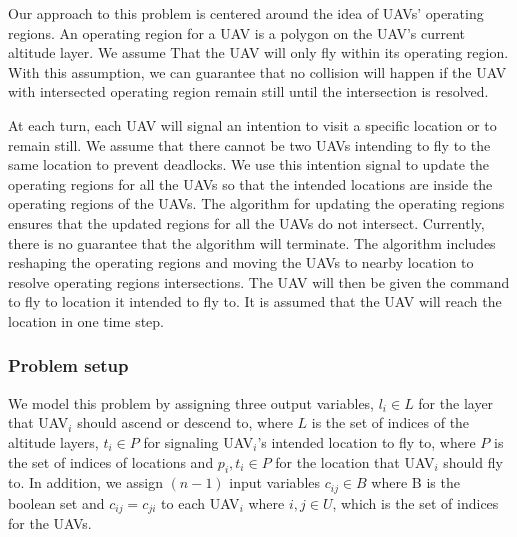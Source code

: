 \documentclass[]{article}
\begin{document}
Our approach to this problem is centered around the idea of UAVs'
operating regions. An operating region for a UAV is a polygon on the
UAV's current altitude layer. We assume That the UAV will only fly
within its operating region. With this assumption, we can guarantee that
no collision will happen if the UAV with intersected operating region
remain still until the intersection is resolved.

At each turn, each UAV will signal an intention to visit a specific location 
or to remain still. We assume that there cannot be two UAVs intending to fly 
to the same location to prevent deadlocks. We use this intention signal to update 
the operating regions for all the UAVs so that the intended locations are inside 
the operating regions of the UAVs. The algorithm for updating the operating regions 
ensures that the updated regions for all the UAVs do not intersect. Currently, there 
is no guarantee that the algorithm will terminate. The algorithm includes reshaping 
the operating regions and moving the UAVs to nearby location to resolve operating 
regions intersections. The UAV will then be given the command to fly to location it 
intended to fly to. It is assumed that the UAV will reach the location in one time step. 

\subsubsection{Problem setup}\label{problem-setup}
We model this problem by assigning three output variables, $l_{i} \in L$ 
for the layer that UAV$_{i}$ should ascend or descend to, where $L$ is the 
set of indices of the altitude layers, $t_{i} \in P$ for signaling UAV$_{i}$'s 
intended location to fly to, where $P$ is the set of indices of locations and 
$p_{i},t_{i} \in P$ for the location that UAV$_{i}$ should fly to. In addition, 
we assign $(n-1)$ input variables $c_{ij} \in B$ where B is the boolean set and 
$c_{ij} = c_{ji}$ to each UAV$_{i}$ where $i,j \in U$, which is the set of indices 
for the UAVs.

\end{document}
